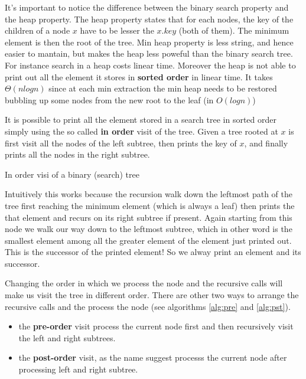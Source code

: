 It's important to notice the difference between the binary search property and the heap property. The heap property states that for each nodes, the key of the children  of a node $x$ have to be lesser the $x.key$ (both of them). The minimum element is then the root of the tree. Min heap property is less string, and hence easier to mantain, but makes the heap less poweful than the binary search tree. For instance search in a heap costs linear time. Moreover the heap is not able to print out all the element it stores in \textbf{sorted order} in linear time. It takes $\Theta(nlogn)$ since at each min extraction the min heap needs to be restored bubbling up some nodes from the new root to the leaf (in $O(log n)$) 

It is possible to print all the element stored in a search tree in sorted order simply using the so called \textbf{in order} visit of the tree. Given a tree rooted at $x$ is first visit all the nodes of the left subtree, then prints the key of $x$, and finally prints all the nodes in the right subtree.



\begin{algorithm}
\caption{In order visi of a binary (search) tree }
\end{algorithm}

Intuitively this works because  the recursion walk down the leftmost path of the tree first reaching the minimum element (which is always a leaf) then prints the that element and recurs on its right subtree if present. Again starting from this node we walk our way down to the leftmost subtree, which in other word is the smallest element among all the greater element of the element just printed out. This is the successor of the printed element! So we alway print an element and its successor.

Changing the order in which we process the node and the recursive calls will make us visit the tree in different order. There are other two ways to arrange the recursive calls and the process the node (see algorithms \ref{alg:pre} and \ref{alg:pst}). 
\begin{itemize}
\item the \textbf{pre-order} visit process the current node first and then recursively visit the left and right subtrees.
\item the \textbf{post-order} visit, as the name suggest processs the current node after processing left and right subtree.
\end{itemize}


